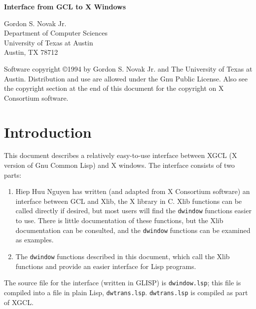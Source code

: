 
\setlength{\oddsidemargin}{0 in}
\setlength{\textwidth}{6.5 in}
\setlength{\textheight}{9.0 in}
\setlength{\parskip}{0.1 in}
\setlength{\parindent}{0.0 in}
\setlength{\topmargin}{-0.4in}



\begin{center}\Large{{\bf Interface from GCL to X Windows}} \\

\vspace*{0.1in}

\large{Gordon S. Novak Jr. \\
Department of Computer Sciences \\
University of Texas at Austin \\
Austin, TX  78712} \\
\end{center}

Software copyright \copyright 1994 by Gordon S. Novak Jr. and
The University of Texas at Austin.  Distribution and use are allowed
under the Gnu Public License.  Also see the copyright section at the end
of this document for the copyright on X Consortium software.

\vspace*{-0.2in}

\section{Introduction}

This document describes a relatively easy-to-use interface between
XGCL (X version of Gnu Common Lisp) and X windows.  The interface
consists of two parts:
\begin{enumerate}
\item Hiep Huu Nguyen has written (and adapted from X Consortium software)
an interface between GCL and Xlib, the X library in C.
Xlib functions can be called directly if desired, but most users will find
the {\tt dwindow} functions easier to use.  There is little documentation
of these functions, but the Xlib documentation can be consulted, and
the {\tt dwindow} functions can be examined as examples.

\item The {\tt dwindow} functions described in this document, which call
the Xlib functions and provide an easier interface for Lisp programs.
\end{enumerate}
The source file for the interface (written in GLISP) is
{\tt dwindow.lsp}; this file is compiled into a file in plain Lisp,
{\tt dwtrans.lsp}.  {\tt dwtrans.lsp} is compiled as part of XGCL.

